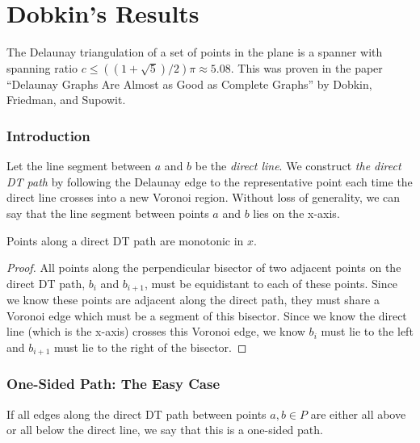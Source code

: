 \documentclass{tufte-handout}
\begin{document}
\newpage

\part{Dobkin's Results}

The Delaunay triangulation of a set of points in the plane is a
spanner with spanning ratio $c \le ((1 + \sqrt{5})/2)\pi \approx
5.08$.  This was proven in the paper ``Delaunay Graphs Are Almost as
Good as Complete Graphs'' by Dobkin, Friedman, and Supowit.  
\cite{Dobkin:1987} \cite{Dobkin:1990}

\section{Introduction}

Let the line segment between $a$ and $b$ be the \emph{direct line}.
We construct \emph{the direct DT path} by following the Delaunay edge
to the representative point each time the direct line crosses into a
new Voronoi region.  Without loss of generality, we can say that the
line segment between points $a$ and $b$ lies on the x-axis.

\begin{Lemma}

  \label{lemma:monotonic:path}

  Points along a direct DT path are monotonic in $x$.

\end{Lemma}

\begin{proof}

  All points along the perpendicular bisector of two adjacent points
  on the direct DT path, $b_i$ and $b_{i+1}$, must be equidistant to
  each of these points.  Since we know these points are adjacent along
  the direct path, they must share a Voronoi edge which must be a
  segment of this bisector.  Since we know the direct line (which is
  the x-axis) crosses this Voronoi edge, we know $b_i$ must lie to the
  left and $b_{i+1}$ must lie to the right of the bisector.
  
\end{proof}

\newpage

\section{One-Sided Path: The Easy Case}

If all edges along the direct DT path between points $a,b \in P$ are
either all above or all below the direct line, we say that this is a
one-sided path.
\end{document}
